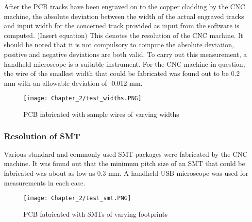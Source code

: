 After the PCB tracks have been engraved on to the copper cladding by the CNC machine, the absolute deviation between the width of the actual engraved tracks and input width for the concerned track provided as input from the software is computed. (Insert equation) This denotes the resolution of the CNC machine. It should be noted that it is not compulsory to compute the absolute deviation, positive and negative deviations are both valid. To carry out this measurement, a handheld microscope is a suitable instrument. For the CNC machine in question, the wire of the smallest width that could be fabricated was found out to be 0.2 mm with an allowable deviation of -0.012 mm.

\begin{figure}[h]
 \centering
 \texttt{[image: Chapter\_2/test\_widths.PNG]}
 \caption{PCB fabricated with sample wires of varying widths}
 \label{fig:wire_widths}
\end{figure}


\subsubsection*{Resolution of SMT}

Various standard and commonly used SMT packages were fabricated by the CNC machine. It was found out that the minimum pitch size of an SMT that could be fabricated was about as low as 0.3 mm. A handheld USB microscope was used for measurements in each case.

\begin{figure}[h]
 \centering
 \texttt{[image: Chapter\_2/test\_smt.PNG]}
 \caption{PCB fabricated with SMTs of varying footprints}
 \label{fig:smts}
\end{figure}
